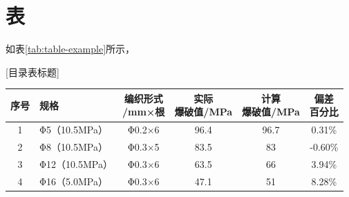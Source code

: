 \section{表}

如表\ref{tab:table-example}所示，


\begin{table}[!htbp]
	\centering
	[目录表标题]
	\label{tab:strength-of-hose}
	\begin{tabular}{@{\extracolsep{\fill}}>{\hspace{0.5cm}}clcccc}
		\toprule
		序号 &    规格     & \tabincell{c}{编织形式\\/mm×根 }& \tabincell{c}{实际\\爆破值/MPa }& \tabincell{c}{计算\\爆破值/MPa}& \tabincell{c}{偏差\\百分比}  \\ \midrule
		1  & Φ5（10.5MPa）  & Φ0.2×6  &   96.4    & 96.7          & 0.31\% \\
		2  & Φ8（10.5MPa）  & Φ0.3×5  &   83.5    & 83          & -0.60\% \\
		3  & Φ12（10.5MPa） & Φ0.3×6  &   63.5    & 66          & 3.94\%  \\
		4  & Φ16（5.0MPa）  & Φ0.3×6  &   47.1    & 51          & 8.28\% \\ \bottomrule
	\end{tabular} 
\end{table}  








